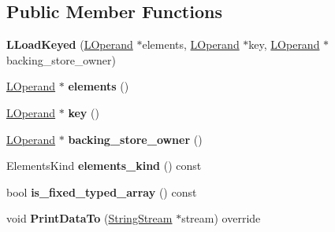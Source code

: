 \subsection*{Public Member Functions}
\begin{DoxyCompactItemize}
\item 
{\bfseries L\+Load\+Keyed} (\hyperlink{classv8_1_1internal_1_1_l_operand}{L\+Operand} $\ast$elements, \hyperlink{classv8_1_1internal_1_1_l_operand}{L\+Operand} $\ast$key, \hyperlink{classv8_1_1internal_1_1_l_operand}{L\+Operand} $\ast$backing\+\_\+store\+\_\+owner)\hypertarget{classv8_1_1internal_1_1_l_load_keyed_ad304d9ea6496224e4a11a6cae2ee335b}{}\label{classv8_1_1internal_1_1_l_load_keyed_ad304d9ea6496224e4a11a6cae2ee335b}

\item 
\hyperlink{classv8_1_1internal_1_1_l_operand}{L\+Operand} $\ast$ {\bfseries elements} ()\hypertarget{classv8_1_1internal_1_1_l_load_keyed_a2fdaa6ebcc228ac46d2a03cffd1468ea}{}\label{classv8_1_1internal_1_1_l_load_keyed_a2fdaa6ebcc228ac46d2a03cffd1468ea}

\item 
\hyperlink{classv8_1_1internal_1_1_l_operand}{L\+Operand} $\ast$ {\bfseries key} ()\hypertarget{classv8_1_1internal_1_1_l_load_keyed_aea9caf0333cbad4a04007bd93e0fb176}{}\label{classv8_1_1internal_1_1_l_load_keyed_aea9caf0333cbad4a04007bd93e0fb176}

\item 
\hyperlink{classv8_1_1internal_1_1_l_operand}{L\+Operand} $\ast$ {\bfseries backing\+\_\+store\+\_\+owner} ()\hypertarget{classv8_1_1internal_1_1_l_load_keyed_abaa0161e1ba4f83060c3bdd5bcf52c44}{}\label{classv8_1_1internal_1_1_l_load_keyed_abaa0161e1ba4f83060c3bdd5bcf52c44}

\item 
Elements\+Kind {\bfseries elements\+\_\+kind} () const \hypertarget{classv8_1_1internal_1_1_l_load_keyed_a59cb1eff8d46bdb1d5d5c59aec4e9f47}{}\label{classv8_1_1internal_1_1_l_load_keyed_a59cb1eff8d46bdb1d5d5c59aec4e9f47}

\item 
bool {\bfseries is\+\_\+fixed\+\_\+typed\+\_\+array} () const \hypertarget{classv8_1_1internal_1_1_l_load_keyed_a4bfabc8b862c384fa4cf2d12bbeb40b1}{}\label{classv8_1_1internal_1_1_l_load_keyed_a4bfabc8b862c384fa4cf2d12bbeb40b1}

\item 
void {\bfseries Print\+Data\+To} (\hyperlink{classv8_1_1internal_1_1_string_stream}{String\+Stream} $\ast$stream) override\hypertarget{classv8_1_1internal_1_1_l_load_keyed_ab79d974cf88e1e1dbd886b24f0ff1984}{}\label{classv8_1_1internal_1_1_l_load_keyed_ab79d974cf88e1e1dbd886b24f0ff1984}


\end{DoxyCompactItemize}
